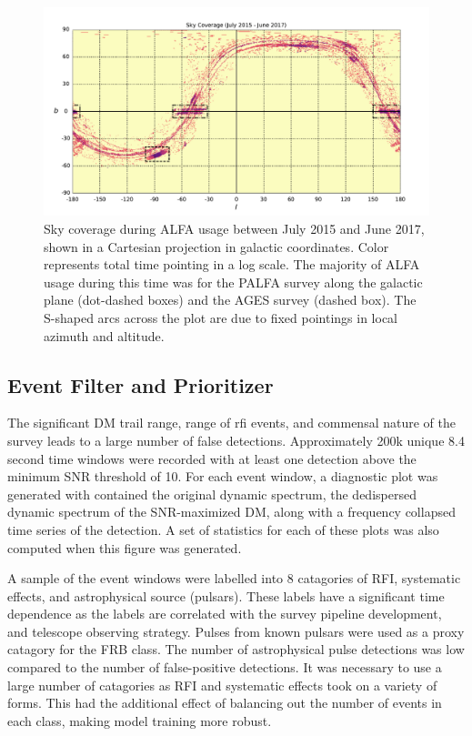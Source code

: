 \documentclass[a4paper,fleqn,usenatbib]{mnras}
\begin{document}
\begin{figure}
    \includegraphics[width=1.0\linewidth]{figures/cartview_sky_coverage.pdf}
    \caption{Sky coverage during ALFA usage between July 2015 and June 2017,
    shown in a Cartesian projection in galactic coordinates. Color represents
    total time pointing in a log scale. The majority of ALFA usage during this
    time was for the PALFA survey along the galactic plane (dot-dashed boxes)
    and the AGES survey (dashed box).  The S-shaped arcs across the plot are due
    to fixed pointings in local azimuth and altitude.
    }
    \label{fig:sky_coverage}
\end{figure}



\subsection{Event Filter and Prioritizer}
\label{sec:event_classify}

The significant DM trail range, range of \gls{rfi} events, and commensal nature
of the survey leads to a large number of false detections. Approximately 200k
unique 8.4 second time windows were recorded with at least one detection above
the minimum SNR threshold of 10. For each event window, a diagnostic plot was
generated with contained the original dynamic spectrum, the dedispersed dynamic
spectrum of the SNR-maximized DM, along with a frequency collapsed time series
of the detection. A set of statistics for each of these plots was also computed
when this figure was generated.

A sample of the event windows were labelled into 8 catagories of RFI, systematic
effects, and astrophysical source (pulsars). These labels have a significant
time dependence as the labels are correlated with the survey pipeline
development, and telescope observing strategy.  Pulses from known pulsars were
used as a proxy catagory for the FRB class. The number of astrophysical pulse
detections was low compared to the number of false-positive detections. It was
necessary to use a large number of catagories as RFI and systematic effects took
on a variety of forms.  This had the additional effect of balancing out the
number of events in each class, making model training more robust.
\end{document}
